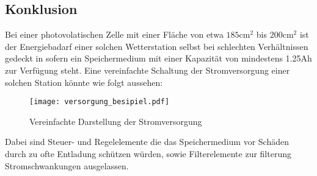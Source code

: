 \subsection{Konklusion}
    Bei einer photovolatischen Zelle mit einer Fläche von etwa
    \(185 \mathrm{cm^2} \) bis \(200 \mathrm{cm^2} \) ist der
    Energiebadarf einer solchen Wetterstation selbst bei schlechten
    Verhältnissen gedeckt in sofern ein Speichermedium mit einer Kapazität
    von mindestens 1.25Ah zur Verfügung steht. Eine vereinfachte Schaltung
    der Stromversorgung einer solchen Station könnte wie folgt aussehen:
    \begin{figure}[H]
        \centering
        \texttt{[image: versorgung\_besipiel.pdf]}
        \caption{Vereinfachte Darstellung der Stromversorgung}
    \end{figure}
    Dabei sind Steuer- und Regelelemente die das Speichermedium vor
    Schäden durch zu ofte Entladung schützen würden, sowie Filterelemente
    zur filterung Stromschwankungen ausgelassen.